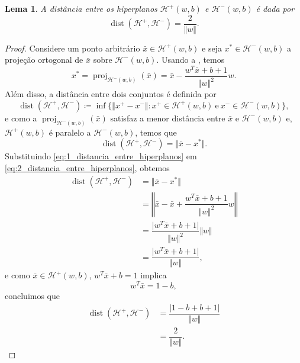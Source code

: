 \documentclass[12pt,a4paper]{scrartcl}
\DeclareMathOperator{\proj}{proj}
\DeclareMathOperator{\dist}{dist}
\def\Hset{\mathcal{H}}
\def\xbar{\bar{x}}
\newtheorem{lema}{Lema}
\theoremstyle{definition}%
\begin{document}
\begin{lema} \label{lema:distancia_entre_hiperplanos} 
A distância entre os hiperplanos $\Hset^{+} (w,b)$ e $\Hset^{-} (w,b)$ é dada por 
\[
\dist(\Hset^{+}, \Hset^{-})=\dfrac{2}{\Vert w\Vert}.
\] 
\end{lema}
\begin{proof}
Considere um ponto arbitrário $\xbar\in \Hset^{+} (w,b)$ e seja $x^{*}\in \Hset^{-} (w,b)$ a projeção ortogonal de $\xbar$ sobre $\Hset^{-} (w,b)$. Usando a , temos
\[ \label{eq:1_distancia_entre_hiperplanos} 
x^{*}= \proj_{\Hset^{-} (w,b)}(\xbar)= \xbar - \dfrac{w^{T}\xbar+b+1}{\Vert w\Vert^{2}}w. 
\] 
Além disso, a distância entre dois conjuntos é definida por
\[ 
\dist(\Hset^{+}, \Hset^{-}) \coloneqq  \inf\{\Vert x^{+}-x^{-} \Vert : x^{+}\in \Hset^{+} (w,b)\ \text{e} \ x^{-}\in \Hset^{-} (w,b) \},
\]
e como a $\proj_{\Hset^{-} (w,b)}(\xbar)$ satisfaz a menor distância entre $\xbar$ e $\Hset^{-} (w,b)$ e, $\Hset^{+} (w,b)$ é paralelo a $\Hset^{-} (w,b)$, temos que 
\[ \label{eq:2_distancia_entre_hiperplanos} 
\dist(\Hset^{+},\Hset^{-})=\Vert \xbar-x^{*}\Vert. 
\]
Substituindo \eqref{eq:1_distancia_entre_hiperplanos} em \eqref{eq:2_distancia_entre_hiperplanos}, obtemos
\begin{align} 
\dist(\Hset^{+},\Hset^{-}) &= \Vert \xbar-x^{*}\Vert \\
&= \left\Vert \xbar -\xbar +\dfrac{w^{T}\xbar+b+1}{\Vert w\Vert^{2}}w \right\Vert \\
&=  \dfrac{\vert w^{T}\xbar+b+1 \vert}{\Vert w\Vert^{2}} \Vert w\Vert \\
&= \dfrac{\vert w^{T}\xbar+b+1 \vert}{\Vert w\Vert},
\end{align}
e como $\xbar\in \Hset^{+} (w,b)$,  $ w^{T}\xbar+b=1$ implica
\[  
w^{T}\xbar =1-b, 
\]
concluimos que 
\begin{align} 
\dist(\Hset^{+},\Hset^{-})&= \dfrac{\vert 1-b+b+1 \vert}{\Vert w\Vert} \\
&= \dfrac{2}{\Vert w\Vert }. 
\end{align}
\end{proof}

\end{document}
